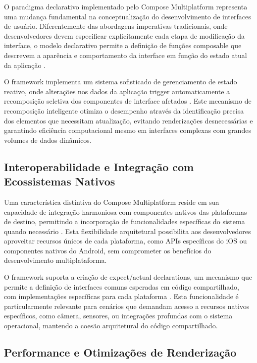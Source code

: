 \documentclass[
	12pt,				    %
	openright,			    %
	oneside,			    %
	a4paper,			    %
    sumario=tradicional,    %
	english,			    %
	brazil,				    %
	]{abntex2}              %
\begin{document}
O paradigma declarativo implementado pelo Compose Multiplatform representa uma mudança fundamental na conceptualização do desenvolvimento de interfaces de usuário. Diferentemente das abordagens imperativas tradicionais, onde desenvolvedores devem especificar explicitamente cada etapa de modificação da interface, o modelo declarativo permite a definição de funções composable que descrevem a aparência e comportamento da interface em função do estado atual da aplicação \cite{gamma2023reactive}.

O framework implementa um sistema sofisticado de gerenciamento de estado reativo, onde alterações nos dados da aplicação trigger automaticamente a recomposição seletiva dos componentes de interface afetados \cite{compose2023state}. Este mecanismo de recomposição inteligente otimiza o desempenho através da identificação precisa dos elementos que necessitam atualização, evitando renderizações desnecessárias e garantindo eficiência computacional mesmo em interfaces complexas com grandes volumes de dados dinâmicos.

\subsection{Interoperabilidade e Integração com Ecossistemas Nativos}

Uma característica distintiva do Compose Multiplatform reside em sua capacidade de integração harmoniosa com componentes nativos das plataformas de destino, permitindo a incorporação de funcionalidades específicas do sistema quando necessário \cite{jetbrains2023interop}. Esta flexibilidade arquitetural possibilita aos desenvolvedores aproveitar recursos únicos de cada plataforma, como APIs específicas do iOS ou componentes nativos do Android, sem comprometer os benefícios do desenvolvimento multiplataforma.

O framework suporta a criação de expect/actual declarations, um mecanismo que permite a definição de interfaces comuns esperadas em código compartilhado, com implementações específicas para cada plataforma \cite{kotlin2023expect}. Esta funcionalidade é particularmente relevante para cenários que demandam acesso a recursos nativos específicos, como câmera, sensores, ou integrações profundas com o sistema operacional, mantendo a coesão arquitetural do código compartilhado.

\subsection{Performance e Otimizações de Renderização}
\end{document}
